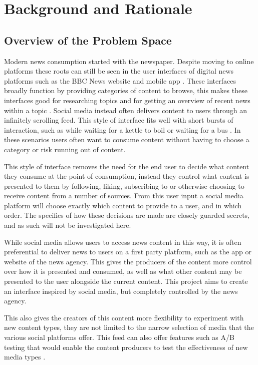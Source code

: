 \documentclass[12pt,titlepage]{article}
\begin{document}
\section{Background and Rationale}

  \subsection{Overview of the Problem Space}

  Modern news consumption started with the newspaper. Despite moving to online
  platforms these roots can still be seen in the user interfaces of digital news
  platforms such as the BBC News website and mobile app \citep{ofcom}. These
  interfaces broadly function by providing categories of content to browse, this
  makes these interfaces good for researching topics and for getting an overview
  of recent news within a topic \citep{yalanska_2021}. Social media instead often
  delivers content to users through an infinitely scrolling feed. This style of
  interface fits well with short bursts of interaction, such as while waiting
  for a kettle to boil or waiting for a bus \citep{yalanska_2020}. In these
  scenarios users often want to consume content without having to choose a
  category or risk running out of content.

  This style of interface removes the need for the end user to decide what
  content they consume at the point of consumption, instead they control what
  content is presented to them by following, liking, subscribing to or otherwise
  choosing to receive content from a number of sources. From this user input a
  social media platform will choose exactly which content to provide to a user,
  and in which order. The specifics of how these decisions are made are closely
  guarded secrets, and as such will not be investigated here.

  While social media allows users to access news content in this way, it is
  often preferential to deliver news to users on a first party platform, such as
  the app or website of the news agency. This gives the producers of the content
  more control over how it is presented and consumed, as well as what other
  content may be presented to the user alongside the current content. This
  project aims to create an interface inspired by social media, but completely
  controlled by the news agency.

  This also gives the creators of this content more flexibility to experiment
  with new content types, they are not limited to the narrow selection of media
  that the various social platforms offer. This feed can also offer features
  such as A/B testing that would enable the content producers to test the
  effectiveness of new media types \citep{ab}.
\end{document}
